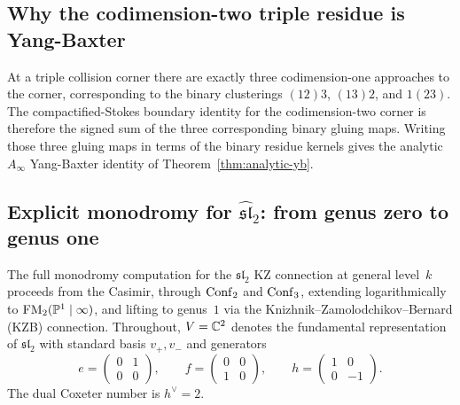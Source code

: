 \subsection{Why the codimension-two triple residue is Yang-Baxter}
At a triple collision corner there are exactly three codimension-one approaches to the corner, corresponding to the binary clusterings $(12)3$, $(13)2$, and $1(23)$. The compactified-Stokes boundary identity for the codimension-two corner is therefore the signed sum of the three corresponding binary gluing maps. Writing those three gluing maps in terms of the binary residue kernels gives the analytic $A_\infty$ Yang-Baxter identity of Theorem~\ref{thm:analytic-yb}.

\subsection{Explicit monodromy for $\widehat{\mathfrak{sl}}_2$: from genus zero to genus one}
\label{subsec:explicit-monodromy-sl2}

The full monodromy computation for the $\mathfrak{sl}_2$ KZ connection
at general level~$k$ proceeds from the Casimir, through
$\mathrm{Conf}_2$ and $\mathrm{Conf}_3$, extending logarithmically to $\mathrm{FM}_2(\mathbb P^1\mid\infty)$,
and lifting to genus~$1$ via the Knizhnik--Zamolodchikov--Bernard (KZB) connection.
Throughout, $V=\mathbb C^2$ denotes the fundamental representation of $\mathfrak{sl}_2$
with standard basis $v_+,v_-$ and generators
\[
 e=\begin{pmatrix}0&1\\0&0\end{pmatrix},\qquad
 f=\begin{pmatrix}0&0\\1&0\end{pmatrix},\qquad
 h=\begin{pmatrix}1&0\\0&-1\end{pmatrix}.
\]
The dual Coxeter number is $h^\vee=2$.

